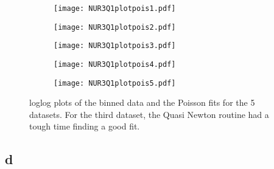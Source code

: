 \begin{figure}[ht]
    \begin{subfigure}{.49\textwidth}
       \centering
    \texttt{[image: NUR3Q1plotpois1.pdf]}
    \centering
    \subcaption{}
    \label{}
    \end{subfigure}
    \hfill
    \begin{subfigure}{.49\textwidth}
       \centering
    \texttt{[image: NUR3Q1plotpois2.pdf]}
    \centering
    \subcaption{}
    \label{}
    \end{subfigure}
     \begin{subfigure}{.49\textwidth}
       \centering
    \texttt{[image: NUR3Q1plotpois3.pdf]}
    \centering
    \subcaption{}
    \label{}
    \end{subfigure}
     \begin{subfigure}{.49\textwidth}
       \centering
    \texttt{[image: NUR3Q1plotpois4.pdf]}
    \centering
    \subcaption{}
    \label{}
    \end{subfigure}
     \begin{subfigure}{.49\textwidth}
       \centering
    \texttt{[image: NUR3Q1plotpois5.pdf]}
    \centering
    \subcaption{}
    \label{}
    \end{subfigure}
    \caption{loglog plots of the binned data and the Poisson fits for the 5 datasets. For the third dataset, the Quasi Newton routine had a tough time finding a good fit.}
    \label{fig:fig3}
\end{figure}


\subsection*{d}

